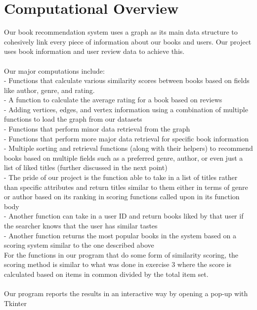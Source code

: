 \documentclass{article}
\begin{document}
\section{Computational Overview}
Our book recommendation system uses a graph as its main data structure to cohesively link every piece of information about our books and users. Our project uses book information and user review data to achieve this.
\\
\\
\indent Our major computations include:\\
\indent - Functions that calculate various similarity scores between books based on fields like author, genre, and rating.\\
\indent - A function to calculate the average rating for a book based on reviews\\
\indent - Adding vertices, edges, and vertex information using a combination of multiple functions to load the graph from our datasets\\
\indent - Functions that perform minor data retrieval from the graph\\
\indent - Functions that perform more major data retrieval for specific book information\\
\indent - Multiple sorting and retrieval functions (along with their helpers) to recommend books based on multiple fields such as a preferred genre, author, or even just a list of liked titles (further discussed in the next point)\\
\indent - The pride of our project is the function able to take in a list of titles rather than specific attributes and return titles similar to them either in terms of genre or author based on its ranking in scoring functions called upon in its function body\\
\indent - Another function can take in a user ID and return books liked by that user if the searcher knows that the user has similar tastes\\
\indent - Another function returns the most popular books in the system based on a scoring system similar to the one described above\\
\indent For the functions in our program that do some form of similarity scoring, the scoring method is similar to what was done in exercise 3 where the score is calculated based on items in common divided by the total item set.
\\
\\
\indent Our program reports the results in an interactive way by opening a pop-up with Tkinter 
\end{document}
